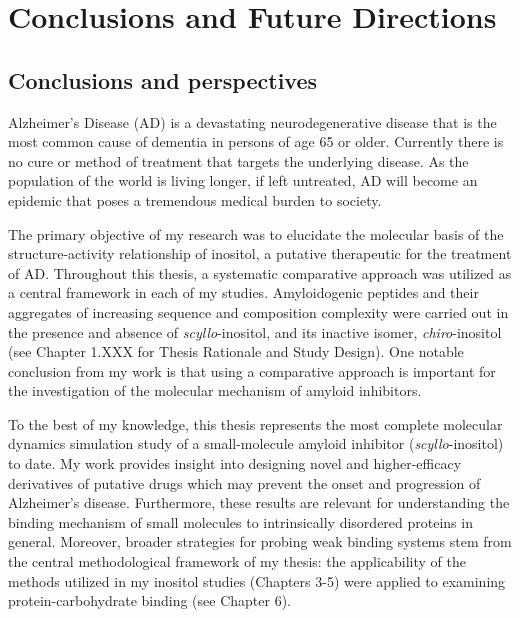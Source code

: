 

\chapter{Conclusions and Future Directions}
\section{Conclusions and perspectives}
Alzheimer's Disease (AD) is a devastating neurodegenerative disease that is the most common cause of dementia in persons of age 65 or older. Currently there is no cure or method of treatment that targets the underlying disease.  As the population of the world is living longer, if left untreated, AD will become an epidemic that poses a tremendous medical burden to society.

The primary objective of my research was to elucidate the molecular basis of the structure-activity relationship of inositol, a putative therapeutic for the treatment of AD. Throughout this thesis, a systematic comparative approach was utilized as a central framework in each of my studies. Amyloidogenic peptides and their aggregates of increasing sequence and composition complexity were carried out in the presence and absence of \emph{scyllo}-inositol, and its inactive isomer, \emph{chiro}-inositol (see Chapter 1.XXX for Thesis Rationale and Study Design). One notable conclusion from my work is that using a comparative approach is important for the investigation of the molecular mechanism of amyloid inhibitors.

To the best of my knowledge, this thesis represents the most complete molecular dynamics simulation study of a small-molecule amyloid inhibitor (\textit{scyllo}-inositol) to date. My work provides insight into designing novel and higher-efficacy derivatives of putative drugs which may prevent the onset and progression of Alzheimer's disease.  Furthermore, these results are relevant for understanding the binding mechanism of small molecules to intrinsically disordered proteins in general. Moreover, broader strategies for probing weak binding systems stem from the central methodological framework of my thesis: the applicability of the methods utilized in my inositol studies (Chapters 3-5) were applied to examining protein-carbohydrate binding (see Chapter 6). 

